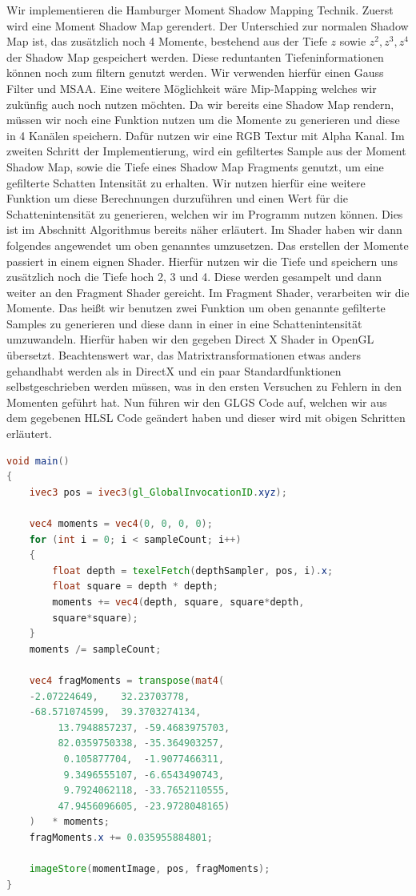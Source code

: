\documentclass[runningheaders,a4paper]{llncs}
\begin{document}
Wir implementieren die Hamburger Moment Shadow Mapping Technik. 
Zuerst wird eine Moment Shadow Map gerendert. Der Unterschied zur normalen Shadow Map ist, das zusätzlich noch 4 Momente, bestehend aus der Tiefe $z$ sowie $z^2,z^3,z^4$ der Shadow Map gespeichert werden. Diese reduntanten Tiefeninformationen können noch zum filtern genutzt werden. Wir verwenden hierfür einen Gauss Filter und MSAA. Eine weitere Möglichkeit wäre Mip-Mapping welches wir zukünfig auch noch nutzen möchten. Da wir bereits eine Shadow Map rendern, müssen wir  noch eine Funktion nutzen um die Momente zu generieren und diese in 4 Kanälen speichern. Dafür nutzen wir eine RGB Textur mit Alpha Kanal.
Im zweiten Schritt der Implementierung, wird ein gefiltertes Sample aus der Moment Shadow Map, sowie die Tiefe eines Shadow Map Fragments genutzt, um eine gefilterte Schatten Intensität zu erhalten.
Wir nutzen hierfür eine weitere Funktion um diese Berechnungen durzuführen und einen Wert für die Schattenintensität zu generieren, welchen wir im Programm nutzen können. Dies ist im Abschnitt Algorithmus bereits näher erläutert.
Im Shader haben wir dann folgendes angewendet um oben genanntes umzusetzen.
Das erstellen der Momente passiert in einem eignen Shader. Hierfür nutzen wir die Tiefe und speichern uns zusätzlich noch die Tiefe hoch 2, 3 und 4. Diese werden gesampelt und dann weiter an den Fragment Shader gereicht.
Im Fragment Shader, verarbeiten wir die Momente. Das heißt wir benutzen zwei Funktion um oben genannte gefilterte Samples zu generieren und diese dann in einer in eine Schattenintensität umzuwandeln. Hierfür haben wir den gegeben Direct X Shader in OpenGL übersetzt. Beachtenswert war, das Matrixtransformationen etwas anders gehandhabt werden als in DirectX und ein paar Standardfunktionen selbstgeschrieben werden müssen, was in den ersten Versuchen zu Fehlern in den Momenten geführt hat. Nun führen wir den GLGS Code auf, welchen wir aus dem gegebenen HLSL Code geändert haben und dieser wird mit obigen Schritten erläutert.

\begin{lstlisting}[language=GLSL]
void main()
{
    ivec3 pos = ivec3(gl_GlobalInvocationID.xyz);

    vec4 moments = vec4(0, 0, 0, 0);
    for (int i = 0; i < sampleCount; i++)
    {
        float depth = texelFetch(depthSampler, pos, i).x;
        float square = depth * depth;
        moments += vec4(depth, square, square*depth, 
        square*square);
    }
    moments /= sampleCount;

	vec4 fragMoments = transpose(mat4(
	-2.07224649,	32.23703778,
	-68.571074599,	39.3703274134,
    	 13.7948857237,	-59.4683975703,
    	 82.0359750338,	-35.364903257,
    	  0.105877704,	-1.9077466311,
    	  9.3496555107,	-6.6543490743,
    	  9.7924062118,	-33.7652110555,
    	 47.9456096605,	-23.9728048165)
    )	* moments;
	fragMoments.x += 0.035955884801;

    imageStore(momentImage, pos, fragMoments);
}
\end{lstlisting}
\end{document}
